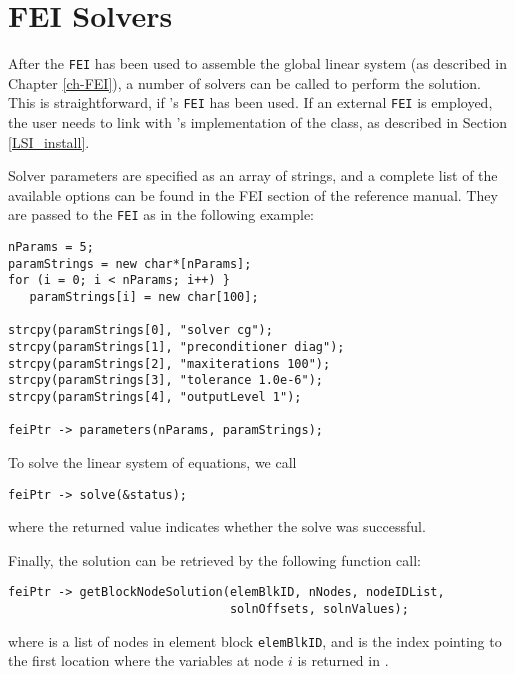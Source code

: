 \section{FEI Solvers}
\label{LSI_solvers}

After the {\tt FEI} has been used to assemble the global linear system
(as described in Chapter \ref{ch-FEI}), a number of \hypre{} solvers
can be called to perform the solution.
This is straightforward, if \hypre's {\tt FEI} has been used.
If an external {\tt FEI} is employed, the user needs to link with \hypre's
implementation of the  class, as described
in Section \ref{LSI_install}.

Solver parameters are specified as an array of strings, and a complete
list of the available options can be found in the FEI section of the reference
manual.
They are passed to the {\tt FEI} as in the following example:
\begin{display}
\begin{verbatim}
nParams = 5;
paramStrings = new char*[nParams];
for (i = 0; i < nParams; i++) }
   paramStrings[i] = new char[100];

strcpy(paramStrings[0], "solver cg");
strcpy(paramStrings[1], "preconditioner diag");
strcpy(paramStrings[2], "maxiterations 100");
strcpy(paramStrings[3], "tolerance 1.0e-6");
strcpy(paramStrings[4], "outputLevel 1");

feiPtr -> parameters(nParams, paramStrings);
\end{verbatim}
\end{display}
To solve the linear system of equations, we call
\begin{display}
\begin{verbatim}
feiPtr -> solve(&status);
\end{verbatim}
\end{display}
where the returned value  indicates whether the solve was successful.

Finally, the solution can be retrieved by the following function call:
\begin{display}
\begin{verbatim}
feiPtr -> getBlockNodeSolution(elemBlkID, nNodes, nodeIDList,
                               solnOffsets, solnValues);
\end{verbatim}
\end{display}
where  is a list of nodes in element block {\tt elemBlkID}, and
 is the index pointing to the first location
where the variables at node $i$ is returned in .

